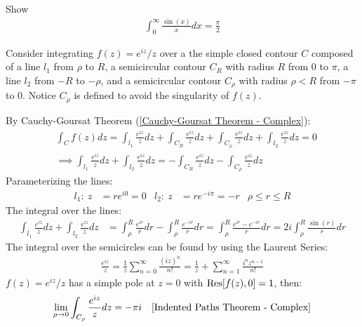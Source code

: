 \documentclass[12pt, english]{book}
\makeatletter
\renewenvironment{proof}[1][\proofname]{\par
	\pushQED{\qed}%
	\normalfont \topsep6\p@\@plus6\p@\relax
	\list{}{%
		\settowidth{\leftmargin}{\itshape\proofname:\hskip\labelsep}%
		\setlength{\labelwidth}{0pt}%
		\setlength{\itemindent}{-\leftmargin}%
		}%
	\item[\hskip\labelsep\itshape#1\@addpunct{:}]\ignorespaces
	}{\popQED\endlist\@endpefalse}
\makeatother
\begin{document}
	\begin{example}
		\label{Dirichlet's Integral Example - Complex}
		Show 
		\begin{align*}
			\int_{0}^{\infty} \frac{\sin(x)}{x} dx = \frac{\pi}{2}
		\end{align*}
		\begin{proof}
			Consider integrating \(f(z) = e^{iz}/z\) over a the simple closed contour \(C\) composed of a line \(l_1\) from \(\rho\) to \(R\), a semicircular contour \(C_R\) with radius \(R\) from \(0\) to \(\pi\), a line \(l_2\) from \(-R\) to \(-\rho\), and a semicircular contour \(C_\rho\) with radius \(\rho < R\) from \(-\pi\) to \(0\). Notice \(C_\rho\) is defined to avoid the singularity of \(f(z)\).
			
			By Cauchy-Goursat Theorem (\cref{Cauchy-Goursat Theorem - Complex}):
			\begin{align*}
				&\int_{C} f(z) dz
				= \int_{l_1} \frac{e^{iz}}{z} dz + \int_{C_R} \frac{e^{iz}}{z} dz + \int_{C_\rho} \frac{e^{iz}}{z} dz + \int_{l_2} \frac{e^{iz}}{z} dz
				= 0 \\
				&\implies \int_{l_1} \frac{e^{iz}}{z} dz + \int_{l_2} \frac{e^{iz}}{z} dz = -\int_{C_R} \frac{e^{iz}}{z} dz - \int_{C_\rho} \frac{e^{iz}}{z} dz
			\end{align*}
			Parameterizing the lines:
			\begin{align*}
				l_1: \ z &= re^{i0} = 0	& 
				l_2: \ z &= re^{-i\pi} = -r & \rho \leq r \leq R
			\end{align*}
			The integral over the lines:
			\begin{align*}
				\int_{l_1} \frac{e^{iz}}{z} dz + \int_{l_2} \frac{e^{iz}}{z} dz
				&= \int_{\rho}^{R} \frac{e^{ir}}{r} dr - \int_{\rho}^{R} \frac{e^{-ir}}{r} dr
				 = \int_{\rho}^{R} \frac{e^{ir} - e^{-ir}}{r} dr = 2i \int_{\rho}^{R} \frac{\sin(r)}{r} dr
			\end{align*}
			The integral over the semicircles can be found by using the Laurent Series:
			\begin{align*}
				\frac{e^{iz}}{z} 
				= \frac{1}{z} \sum_{n=0}^{\infty} \frac{(iz)^n}{n!} 
				= \frac{1}{z} + \sum_{n=1}^{\infty} \frac{i^n z^{n-1}}{n!}
			\end{align*}
			\(f(z) = e^{iz}/z\) has a simple pole at \(z=0\) with \(\Res[f(z), 0] = 1\), then:
			\begin{align*}
				\lim_{\rho \rightarrow 0} \int_{C_\rho} \frac{e^{iz}}{z} dz &= -\pi i
					& \text{\Cref{Indented Paths Theorem - Complex}}

\end{align*}
\end{proof}
\end{example}
\end{document}
